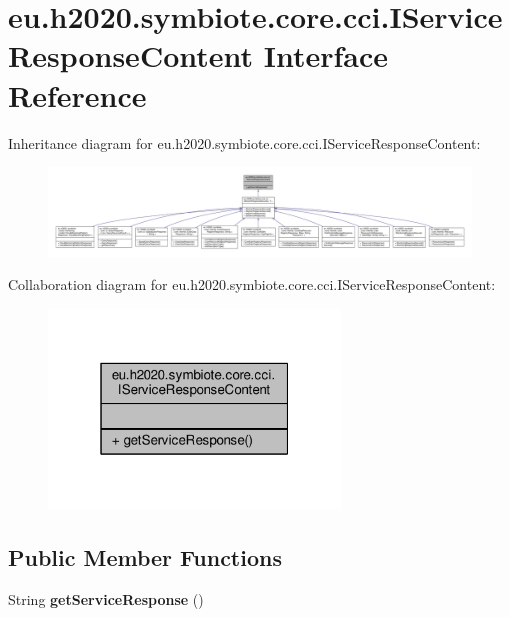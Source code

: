 \hypertarget{interfaceeu_1_1h2020_1_1symbiote_1_1core_1_1cci_1_1IServiceResponseContent}{}\section{eu.\+h2020.\+symbiote.\+core.\+cci.\+I\+Service\+Response\+Content Interface Reference}
\label{interfaceeu_1_1h2020_1_1symbiote_1_1core_1_1cci_1_1IServiceResponseContent}


Inheritance diagram for eu.\+h2020.\+symbiote.\+core.\+cci.\+I\+Service\+Response\+Content\+:
\nopagebreak
\begin{figure}[H]
\begin{center}
\leavevmode
\includegraphics[width=350pt]{interfaceeu_1_1h2020_1_1symbiote_1_1core_1_1cci_1_1IServiceResponseContent__inherit__graph}
\end{center}
\end{figure}


Collaboration diagram for eu.\+h2020.\+symbiote.\+core.\+cci.\+I\+Service\+Response\+Content\+:
\nopagebreak
\begin{figure}[H]
\begin{center}
\leavevmode
\includegraphics[width=220pt]{interfaceeu_1_1h2020_1_1symbiote_1_1core_1_1cci_1_1IServiceResponseContent__coll__graph}
\end{center}
\end{figure}
\subsection*{Public Member Functions}
\begin{DoxyCompactItemize}
\item 
\mbox{\label{interfaceeu_1_1h2020_1_1symbiote_1_1core_1_1cci_1_1IServiceResponseContent_aaef40b6a9a92e8a52eb58bb1b21cf1c4}} 
String {\bfseries get\+Service\+Response} ()
\end{DoxyCompactItemize}


